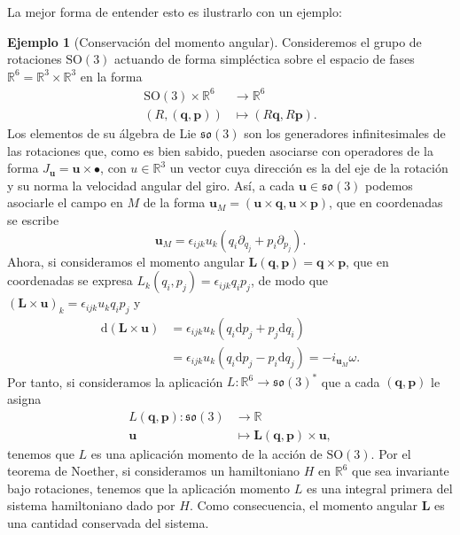 \documentclass[12pt,a4paper,twocolumn,reqno]{amsart}
\theoremstyle{definition} \newtheorem{defn}[thm]{Definición}
\theoremstyle{definition} \newtheorem{ejemplo}[thm]{Ejemplo}
\theoremstyle{definition} \newtheorem{ejercicio}[thm]{Ejercicio}
\theoremstyle{remark} \newtheorem*{obs}{Observación}
\def\RR{\mathbb{R}}
\def\dd{\mathrm{d}}
\newcommand{\vect}[1]{\mathbf{#1}}
\begin{document}
  La mejor forma de entender esto es ilustrarlo con un ejemplo:
  \begin{ejemplo}[Conservación del momento angular]
    Consideremos el grupo de rotaciones $\mathrm{SO}(3)$ actuando de forma simpléctica sobre el espacio de fases $\RR^6=\RR^3\times \RR^3$ en la forma
    \begin{align*}
      \mathrm{SO}(3)\times \RR^6&\longrightarrow \RR^6\\ 
      (R,(\vect{q},\vect{p})) &\longmapsto (R\vect{q},R\vect{p}) .
      \end{align*} 
      Los elementos de su álgebra de Lie $\mathfrak{so}(3)$ son los generadores infinitesimales de las rotaciones que, como es bien sabido, pueden asociarse con operadores de la forma $J_{\vect{u}}=\vect{u}\times \bullet$, con $u\in \RR^3$ un vector cuya dirección es la del eje de la rotación y su norma la velocidad angular del giro. Así, a cada $\vect{u}\in \mathfrak{so}(3)$ podemos asociarle el campo en $M$ de la forma $\vect{u}_M=(\vect{u}\times \vect{q}, \vect{u}\times \vect{p})$, que en coordenadas se escribe
      \begin{equation*}
	\vect{u}_M=\epsilon_{ijk}u_k(q_i \partial_{q_j}+p_i \partial_{p_j}).
      \end{equation*}
      Ahora, si consideramos el momento angular $\vect{L}(\vect{q},\vect{p})=\vect{q}\times \vect{p}$, que en coordenadas se expresa $L_k(q_i,p_j)=\epsilon_{ijk}q_ip_j$, de modo que $(\vect{L}\times\vect{u})_{k}=\epsilon_{ijk}u_kq_ip_j$ y 
      \begin{align*}
	\dd(\vect{L}\times \vect{u})&=\epsilon_{ijk}u_k(q_i\dd p_j + p_j\dd q_i)\\ &=\epsilon_{ijk}u_k(q_i\dd p_j - p_i\dd q_j)=-i_{\vect{u}_M}\omega.
      \end{align*}
      Por tanto, si consideramos la aplicación $L:\RR^6\rightarrow\mathfrak{so}(3)^*$ que a cada $(\vect{q},\vect{p})$ le asigna  
      \begin{align*}
	L(\vect{q},\vect{p}) :\mathfrak{so}(3)&\longrightarrow \RR\\ 
	\vect{u} &\longmapsto \vect{L}(\vect{q},\vect{p})\times \vect{u},
	\end{align*}
	tenemos que $L$ es una aplicación momento de la acción de $\mathrm{SO}(3)$. Por el teorema de Noether, si consideramos un hamiltoniano $H$ en $\RR^6$ que sea invariante bajo rotaciones, tenemos que la aplicación momento $L$ es una integral primera del sistema hamiltoniano dado por $H$. Como consecuencia, el momento angular $\vect{L}$ es una cantidad conservada del sistema.
  \end{ejemplo}
\end{document}
